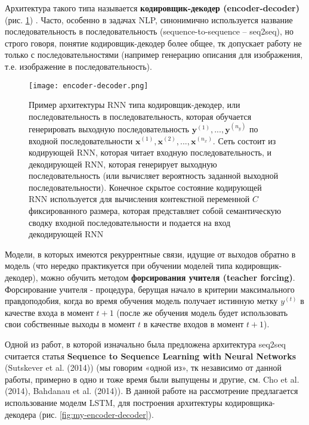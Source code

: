 Архитектура такого типа называется \textbf{кодировщик-декодер (encoder-decoder)} 
(рис. \ref{fig:encoder-decoder}) \cite{Goodfellow-et-al-2016}. 
Часто, особенно в задачах NLP, синонимично используется название 
последовательность в последовательность (sequence-to-sequence -- seq2seq), 
но строго говоря, понятие кодировщик-декодер более общее, тк 
допускает работу не только с последовательностями (например генерацию 
описания для изображения, т.е. изображение в последовательность). 

\begin{figure}[h!]
    \centering
    \texttt{[image: encoder-decoder.png]}
    \caption{Пример архитектуры RNN типа кодировщик-декодер, или
    последовательность в последовательность, которая обучается генерировать 
    выходную последовательность $\bm{y}^{(1)}, ..., \bm{y}^{(n_y)}$ по 
    входной последовательности $\bm{x}^{(1)}, \bm{x}^{(2)}, ..., \bm{x}^{(n_x)}$. 
    Сеть состоит из кодирующей RNN, которая читает
    входную последовательность, и декодирующей RNN, которая генерирует
    выходную последовательность (или вычисляет вероятность заданной выходной 
    последовательности). Конечное скрытое состояние кодирующей
    RNN используется для вычисления контекстной переменной $C$ фиксированного 
    размера, которая представляет собой семантическую сводку входной
    последовательности и подается на вход декодирующей RNN}
    \label{fig:encoder-decoder}
\end{figure}

\newpage

Модели, в которых имеются рекуррентные связи, идущие от выходов обратно в 
модель (что нередко практикуется при обучении моделей типа кодировщик-декодер), 
можно обучить методом \textbf{форсирования учителя (teacher forcing)}. Форсирование 
учителя - процедура, берущая начало в критерии максимального правдоподобия,
когда во время обучения модель получает истинную метку $y^{(t)}$ в качестве входа в 
момент $t + 1$ (после же обучения модель будет использовать свои собственные 
выходы в момент $t$ в качестве входов в момент $t + 1$).

Одной из работ, в которой изначально была предложена архитектура 
seq2seq считается статья \textbf{Sequence to Sequence Learning with Neural Networks} 
(Sutskever et al. (2014)) \cite{seq2seq} (мы говорим «одной из», тк независимо 
от данной работы, примерно в одно и тоже время были выпущены и другие, см. Cho et al. (2014), 
Bahdanau et al. (2014)). В данной работе на рассмотрение предлагается использование 
моделм LSTM, для построения архитектуры кодировщика-декодера 
(рис. \ref{fig:my-encoder-decoder}).

